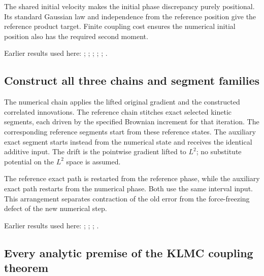 \documentclass[11pt,a4paper]{report}
\begin{document}
The shared initial velocity makes the initial phase discrepancy purely positional. Its standard Gaussian law and independence from the reference position give the reference product target. Finite coupling cost ensures the numerical initial position also has the required second moment.



Earlier results used here: \cite[Section~3.17.1]{LangevinLean2026ULASC}; \cite[Section~3.17.2]{LangevinLean2026ULASC}; \cite[Section~3.22.17]{LangevinLean2026ULASC}; \cite[Section~3.22.19]{LangevinLean2026ULASC}; \cite[Section~3.22.20]{LangevinLean2026ULASC}; \cite[Section~3.22.6]{LangevinLean2026ULASC}.
\subsection{\texorpdfstring{Construct all three chains and segment families}{Construct all three chains and segment families}}
\label{report-step-KineticLangevin-GenericCanonicalKLMC-lean-6}


The numerical chain applies the lifted original gradient and the constructed correlated innovations. The reference chain stitches exact selected kinetic segments, each driven by the specified Brownian increment for that iteration. The corresponding reference segments start from these reference states. The auxiliary exact segment starts instead from the numerical state and receives the identical additive input. The drift is the pointwise gradient lifted to \(L^{2}\); no substitute potential on the \(L^{2}\) space is assumed.



The reference exact path is restarted from the reference phase, while the auxiliary exact path restarts from the numerical phase. Both use the same interval input. This arrangement separates contraction of the old error from the force-freezing defect of the new numerical step.



Earlier results used here: \cite[Section~3.13.2]{LangevinLean2026ULASC}; \cite[Section~3.13.5]{LangevinLean2026ULASC}; \cite[Section~3.17.1]{LangevinLean2026ULASC}; \cite[Section~3.17.2]{LangevinLean2026ULASC}.
\subsection{\texorpdfstring{Every analytic premise of the KLMC coupling theorem}{Every analytic premise of the KLMC coupling theorem}}
\label{report-step-KineticLangevin-GenericCanonicalKLMC-lean-7}
\end{document}
